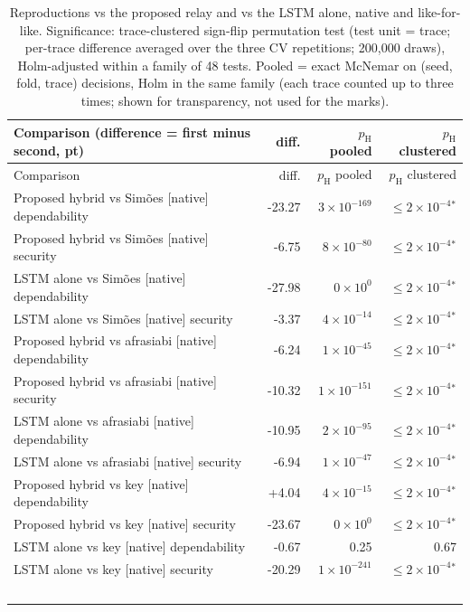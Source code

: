 \begin{longtable}{@{}p{8.6cm}rrr@{}}
\caption{Reproductions vs the proposed relay and vs the LSTM alone, native and like-for-like. Significance: trace-clustered sign-flip permutation test (test unit = trace; per-trace difference averaged over the three CV repetitions; 200{,}000 draws), Holm-adjusted within a family of 48 tests. Pooled = exact McNemar on (seed, fold, trace) decisions, Holm in the same family (each trace counted up to three times; shown for transparency, not used for the marks).}\label{tab:S3}\\
\toprule Comparison (difference = first minus second, pt) & diff. & $p_{\mathrm{H}}$ pooled & $p_{\mathrm{H}}$ clustered \\ \midrule \endfirsthead
\toprule Comparison & diff. & $p_{\mathrm{H}}$ pooled & $p_{\mathrm{H}}$ clustered \\ \midrule \endhead
Proposed hybrid vs Sim\~oes [native] dependability & -23.27 & $3\times10^{-169}$ & $\le 2\times10^{-4}$$^{*}$ \\
Proposed hybrid vs Sim\~oes [native] security & -6.75 & $8\times10^{-80}$ & $\le 2\times10^{-4}$$^{*}$ \\
LSTM alone vs Sim\~oes [native] dependability & -27.98 & $0\times10^{0}$ & $\le 2\times10^{-4}$$^{*}$ \\
LSTM alone vs Sim\~oes [native] security & -3.37 & $4\times10^{-14}$ & $\le 2\times10^{-4}$$^{*}$ \\
Proposed hybrid vs afrasiabi [native] dependability & -6.24 & $1\times10^{-45}$ & $\le 2\times10^{-4}$$^{*}$ \\
Proposed hybrid vs afrasiabi [native] security & -10.32 & $1\times10^{-151}$ & $\le 2\times10^{-4}$$^{*}$ \\
LSTM alone vs afrasiabi [native] dependability & -10.95 & $2\times10^{-95}$ & $\le 2\times10^{-4}$$^{*}$ \\
LSTM alone vs afrasiabi [native] security & -6.94 & $1\times10^{-47}$ & $\le 2\times10^{-4}$$^{*}$ \\
Proposed hybrid vs key [native] dependability & +4.04 & $4\times10^{-15}$ & $\le 2\times10^{-4}$$^{*}$ \\
Proposed hybrid vs key [native] security & -23.67 & $0\times10^{0}$ & $\le 2\times10^{-4}$$^{*}$ \\
LSTM alone vs key [native] dependability & -0.67 & 0.25 & 0.67 \\
LSTM alone vs key [native] security & -20.29 & $1\times10^{-241}$ & $\le 2\times10^{-4}$$^{*}$ \\
$$
\end{longtable}
